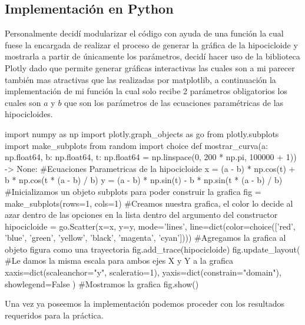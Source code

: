 \documentclass[letterpaper,11pt,dvipsnames]{article}
\begin{document}
\subsection{Implementación en Python}
Personalmente decidí modularizar el código con ayuda de una función la cual fuese la encargada de realizar el proceso de generar la gráfica de la hipocicloide y mostrarla a partir de únicamente los parámetros, decidí hacer uso de la biblioteca Plotly dado que permite generar gráficas interactivas las cuales son a mi parecer también mas atractivas que las realizadas por matplotlib, a continuación la implementación de mi función la cual solo recibe 2 parámetros obligatorios los cuales son $a$ y $b$ que son los parámetros de las ecuaciones paramétricas de las hipocicloides.
\begin{pythoncode}[caption={Implementación de la función para mostrar hipocicloides dados solamente $a$ y $b$}]
import numpy as np
import plotly.graph_objects as go
from plotly.subplots import make_subplots
from random import choice
def mostrar_curva(a: np.float64, b: np.float64, t: np.float64 = np.linspace(0, 200 * np.pi, 100000 + 1)) -> None:
    #Ecuaciones Parametricas de la hipocicloide
    x = (a - b) * np.cos(t) + b * np.cos(t * (a - b) / b) 
    y = (a - b) * np.sin(t) - b * np.sin(t * (a - b) / b)
    #Inicializamos un objeto subplots para poder construir la grafica
    fig = make_subplots(rows=1, cols=1)
    #Creamos nuestra grafica, el color lo decide al azar dentro de las opciones en la lista dentro del argumento del constructor
    hipocicloide = go.Scatter(x=x, y=y, mode='lines', line=dict(color=choice(['red', 'blue', 'green', 'yellow', 'black', 'magenta', 'cyan'])))
    #Agregamos la grafica al objeto figura como una trayectoria
    fig.add_trace(hipocicloide)
    fig.update_layout(
        #Le damos la misma escala para ambos ejes X y Y a la grafica
        xaxis=dict(scaleanchor="y", scaleratio=1),
        yaxis=dict(constrain="domain"),
        showlegend=False
    )
    #Mostramos la grafica
    fig.show()
\end{pythoncode}
Una vez ya poseemos la implementación podemos proceder con los resultados requeridos para la práctica.
\newpage
\end{document}

